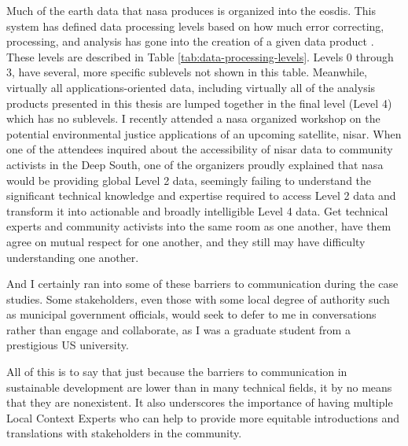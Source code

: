 Much of the earth data that \ac{nasa} produces is organized into the \ac{eosdis}. This system has defined data processing levels based on how much error correcting, processing, and analysis has gone into the creation of a given data product \cite{earthsciencedatasystemsDataProcessingLevels2016}. These levels are described in Table \ref{tab:data-processing-levels}. Levels 0 through 3, have several, more specific sublevels not shown in this table. Meanwhile, virtually all applications-oriented data, including virtually all of the analysis products presented in this thesis are lumped together in the final level (Level 4) which has no sublevels. I recently attended a \ac{nasa} organized workshop on the potential environmental justice applications of an upcoming satellite, \ac{nisar}. When one of the attendees inquired about the accessibility of \ac{nisar} data to community activists in the Deep South, one of the organizers proudly explained that \ac{nasa} would be providing global Level 2 data, seemingly failing to understand the significant technical knowledge and expertise required to access Level 2 data and transform it into actionable and broadly intelligible Level 4 data. Get technical experts and community activists into the same room as one another, have them agree on mutual respect for one another, and they still may have difficulty understanding one another.

And I certainly ran into some of these barriers to communication during the case studies. Some stakeholders, even those with some local degree of authority such as municipal government officials, would seek to defer to me in conversations rather than engage and collaborate, as I was a graduate student from a prestigious US university. 

All of this is to say that just because the barriers to communication in sustainable development are lower than in many technical fields, it by no means that they are nonexistent. It also underscores the importance of having multiple Local Context Experts who can help to provide more equitable introductions and translations with stakeholders in the community.

